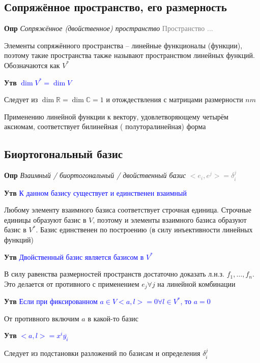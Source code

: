 \documentclass[a4paper, 14pt]{article}
\begin{document}
    \subsection{Сопряжённое пространство, его размерность}

    \textbf{Опр} \textit{Сопряжённое (двойственное) пространство} \textcolor{gray}{Пространство ...}

    Элементы сопряжённого пространства -- линейные функционалы (функции), поэтому такие пространства также называют
    пространством линейных функций.
    Обозначаются как $V^*$

    \textbf{Утв} \textcolor{blue}{$\dim V^* = \dim V$}

    Следует из $\dim \mathbb{R} = \dim \mathbb{C} = 1$ и отождествления с матрицами размерности $nm$

    Применению линейной функции к вектору, удовлетворяющему четырём аксиомам, соответствует билинейная (
    полуторалинейная) форма

    \subsection{Биортогональный базис}

    \textbf{Опр} \textit{Взаимный / биортогональный / двойственный базис} \textcolor{gray}{$<e_i, e^j> = \delta_i^j$}

    \textbf{Утв} \textcolor{blue}{К данном базису существует и единственен взаимный}

    Любому элементу взаимного базиса соответствует строчная единица.
    Строчные единицы образуют базис в $V$, поэтому и элементы взаимного базиса образуют базис в $V^*$.
    Базис единственен по построению (в силу инъективности линейных функций)

    \textbf{Утв} \textcolor{blue}{Двойственный базис является базисом в $V^*$}

    В силу равенства размерностей пространств достаточно доказать л.н.з. $f_1, \dots, f_n$.
    Это делается от противного с применением $e_j \forall j$ на линейной комбинации

    \textbf{Утв} \textcolor{blue}{Если при фиксированном $a \in V <a, l> = 0 \forall l \in V^*$, то $a = 0$}

    От противного включим $a$ в какой-то базис

    \textbf{Утв} \textcolor{blue}{$<a, l> = x^i \overline{y_i}$}

    Следует из подстановки разложений по базисам и определения $\delta_i^j$
\end{document}
